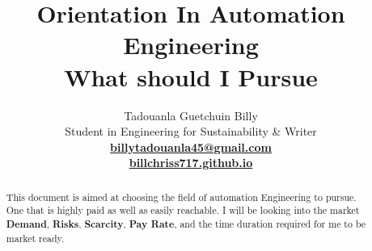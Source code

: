 \documentclass[12pt, a4paper]{article}
\title{
  {\bfseries\color{navyblue} Orientation In Automation Engineering}\\
  \large What should I Pursue
}
\author{
  Tadouanla Guetchuin Billy \\ 
  {\small Student in Engineering for Sustainability \& Writer}\\[0.3em]
  {\small\rmfamily\bfseries
    \href{mailto:billytadouanla45@gmail.com}
    {billytadouanla45@gmail.com}
  }\\[0.3em]
  {\small\rmfamily\bfseries
    \href{https://billchriss717.github.io/}
    {billchriss717.github.io}
  }
}
\begin{document}
\maketitle
{}
\setcounter{page}{1}

\begin{abstract}
  This document is aimed at choosing the field of automation Engineering to pursue. One
  that is highly paid as well as easily reachable. I will be looking into the market
  \textbf{Demand},  \textbf{Risks}, \textbf{Scarcity},  \textbf{Pay Rate}, and the time duration
  required for me to be market ready.
\end{abstract}

\tableofcontents
\newpage
{}
\setcounter{page}{1}


\end{document}
